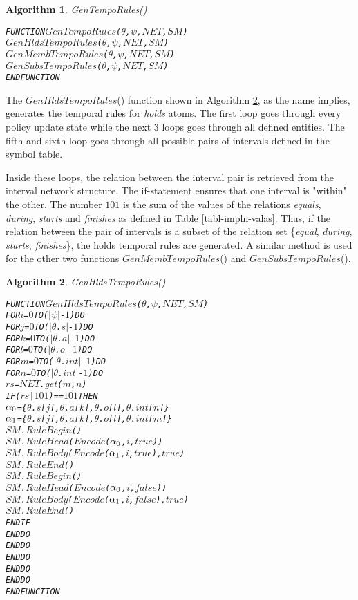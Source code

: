 \documentclass[11pt]{report}
\newenvironment{vverbatim}
{
  \begin{alltt}
}
{
    \vspace{-\baselineskip}
  \end{alltt}
}
\newtheorem{vvalgorithm}{Algorithm}[chapter]
\newenvironment{valgorithm}[2]
{
  \begin{vvalgorithm}{#1}
    \label{#2}
    \small
    \begin{vverbatim}
}
{
    \end{vverbatim}
  \end{vvalgorithm}
}
\begin{document}
          \begin{valgorithm}{GenTempoRules()}{algo-impln-gente}
FUNCTION \(GenTempoRules\)(\(\theta\), \(\psi\), \(NET\), \(SM\))
  \(GenHldsTempoRules\)(\(\theta\), \(\psi\), \(NET\), \(SM\))
  \(GenMembTempoRules\)(\(\theta\), \(\psi\), \(NET\), \(SM\))
  \(GenSubsTempoRules\)(\(\theta\), \(\psi\), \(NET\), \(SM\))
ENDFUNCTION
          \end{valgorithm}

          The $GenHldsTempoRules$() function shown in Algorithm
          \ref{algo-impln-ghdtr}, as the name implies, generates the temporal
          rules for {\em holds} atoms. The first loop goes through every policy
          update state while the next 3 loops goes through all defined
          entities. The fifth and sixth loop goes through all possible pairs
          of intervals defined in the symbol table.

          Inside these loops, the relation between the interval pair is
          retrieved from the interval network structure. The if-statement
          ensures that one interval is "within" the other. The number $101$ is
          the sum of the values of the relations {\em equals}, {\em during},
          {\em starts} and {\em finishes} as defined in Table
          \ref{tabl-impln-valas}. Thus, if the relation between the pair of
          intervals is a subset of the relation set \{{\em equal},
          {\em during}, {\em starts}, {\em finishes}\}, the holds temporal
          rules are generated. A similar method is used for the other two
          functions $GenMembTempoRules$() and $GenSubsTempoRules$().

          \begin{valgorithm}{GenHldsTempoRules()}{algo-impln-ghdtr}
FUNCTION \(GenHldsTempoRules\)(\(\theta\), \(\psi\), \(NET\), \(SM\))
  FOR \(i\) = \(0\) TO (\(|\psi|\) - \(1\)) DO
    FOR \(j\) = \(0\) TO (\(|\)\(\theta\).\(s\)\(|\) - \(1\)) DO
      FOR \(k\) = \(0\) TO (\(|\)\(\theta\).\(a\)\(|\) - \(1\)) DO
        FOR \(l\) = \(0\) TO (\(|\)\(\theta\).\(o\)\(|\) - \(1\)) DO
          FOR \(m\) = \(0\) TO (\(|\)\(\theta\).\(int\)\(|\) - \(1\)) DO
            FOR \(n\) = \(0\) TO (\(|\)\(\theta\).\(int\)\(|\) - \(1\)) DO
              \(rs\) = \(NET\).\(get\)(\(m\), \(n\))
              IF (\(rs\) | \(101\)) == \(101\) THEN
                \(\alpha\sb{0}\) = \{\(\theta\).\(s\)[\(j\)], \(\theta\).\(a\)[\(k\)], \(\theta\).\(o\)[\(l\)], \(\theta\).\(int\)[\(n\)]\}
                \(\alpha\sb{1}\) = \{\(\theta\).\(s\)[\(j\)], \(\theta\).\(a\)[\(k\)], \(\theta\).\(o\)[\(l\)], \(\theta\).\(int\)[\(m\)]\}
                \(SM\).\(RuleBegin\)()
                \(SM\).\(RuleHead\)(\(Encode\)(\(\alpha\sb{0}\), \(i\), \(true\)))
                \(SM\).\(RuleBody\)(\(Encode\)(\(\alpha\sb{1}\), \(i\), \(true\)), \(true\))
                \(SM\).\(RuleEnd\)()
                \(SM\).\(RuleBegin\)()
                \(SM\).\(RuleHead\)(\(Encode\)(\(\alpha\sb{0}\), \(i\), \(false\)))
                \(SM\).\(RuleBody\)(\(Encode\)(\(\alpha\sb{1}\), \(i\), \(false\)), \(true\))
                \(SM\).\(RuleEnd\)()
              ENDIF
          ENDDO
        ENDDO
      ENDDO
    ENDDO
  ENDDO
ENDFUNCTION
          \end{valgorithm}
\end{document}
